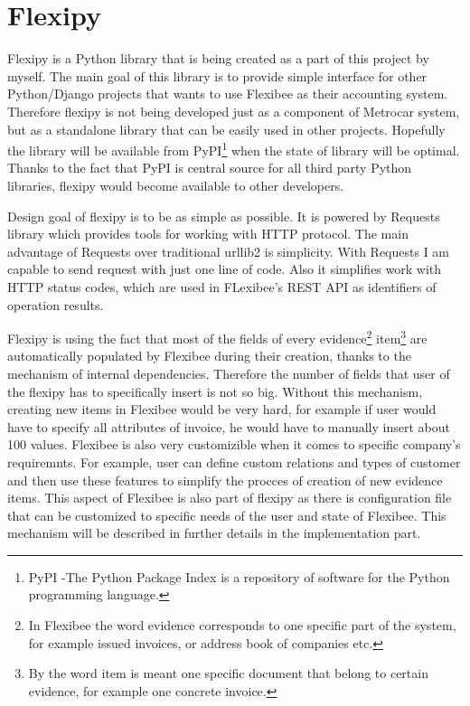 \documentclass[11pt,twoside,a4paper]{book}
\begin{document}
\section{Flexipy}
Flexipy is a Python library that is being created as a part of this project by myself. The main goal of this library is to provide simple interface for other Python/Django projects that wants to use Flexibee as their accounting system. Therefore flexipy is not being developed just as a component of Metrocar system, but as a standalone library that can be easily used in other projects. Hopefully the library will be available from PyPI\footnote{PyPI -The Python Package Index is a repository of software for the Python programming language.} when the state of library will be optimal. Thanks to the fact that PyPI is central source for all third party Python libraries, flexipy would become available to other developers. 

Design goal of flexipy is to be as simple as possible. It is powered by Requests library\cite{requests} which provides tools for working with HTTP protocol. The main advantage of Requests over traditional urllib2 is simplicity. With Requests I am capable to send request with just one line of code. Also it simplifies work with HTTP status codes, which are used in FLexibee's REST API as identifiers of operation results.

Flexipy is using the fact that most of the fields of every evidence\footnote{In Flexibee the word evidence corresponds to one specific part of the system, for example issued invoices, or address book of companies etc.} item\footnote{By the word item is meant one specific document that belong to certain evidence, for example one concrete invoice.} are automatically populated by Flexibee during their creation, thanks to the mechanism of internal dependencies\cite{flexDep}. Therefore the number of fields that user of the flexipy has to specifically insert is not so big. Without this mechanism, creating new items in Flexibee would be very hard, for example if user would have to specify all attributes of invoice, he would have to manually insert about 100 values. Flexibee is also very customizible when it comes to specific company's requiremnts. For example, user can define custom relations and types of customer and then use these features to simplify the procces of creation of new evidence items. This aspect of Flexibee is also part of flexipy as there is configuration file that can be customized to specific needs of the user and state of Flexibee. This mechanism will be described in further details in the implementation part. 
\end{document}

